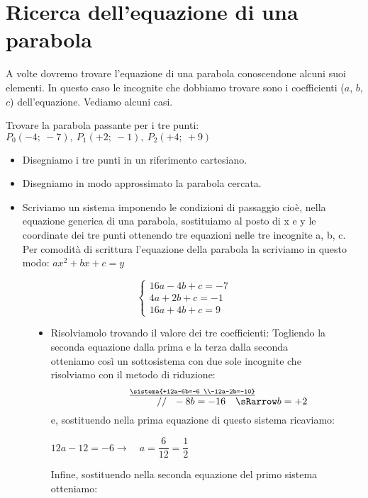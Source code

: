 \section{Ricerca dell'equazione di una parabola}
\label{sec:parabola_altreparabole}

A volte dovremo trovare l'equazione di una parabola conoscendone alcuni suoi
elementi. In questo caso le incognite che dobbiamo trovare sono i coefficienti
(\(a\), \(b\), \(c\)) dell'equazione. Vediamo alcuni casi.

\begin{esempio}
 Trovare la parabola passante per i tre
 punti:~\(P_0(-4;~-7),~ P_1(+2;~-1),~ P_2(+4;~+9)\)

 \begin{itemize}
  \item Disegniamo i tre punti in un riferimento cartesiano.
  \item Disegniamo in modo approssimato la parabola cercata.
  \item Scriviamo un sistema imponendo le condizioni di passaggio cioè,
   nella equazione generica di una parabola, sostituiamo al posto di x e y
   le coordinate dei tre punti ottenendo tre equazioni nelle tre
   incognite a, b, c. Per comodità di scrittura l'equazione della parabola la
   scriviamo in questo modo: \(ax^2+bx+c=y\)
 \end{itemize}
\begin{figure}[h]
\begin{minipage}{.60\textwidth}
\[\left\{\begin{array}{l}
  16a-4b+c=-7\\
  4a+2b+c=-1\\
  16a+4b+c=9
\end{array}\right. \]
 \begin{itemize}
  \item Risolviamolo trovando il valore dei tre coefficienti:
   Togliendo la seconda equazione dalla prima e la terza dalla seconda
   otteniamo così un sottosistema con due sole incognite che risolviamo con
   il metodo di riduzione:
\[\stackrel{\underline{\sistema{+12a-6b=-6 \\-12a-2b=-10}}}
  {\qquad \qquad \qquad ~~~~~~ // ~~ -8b =-16 \quad \sRarrow b=+2}\]
e, sostituendo nella prima equazione di questo sistema ricaviamo:

\(12a-12=-6 \rightarrow \quad a=\dfrac{6}{12}=\dfrac{1}{2}\)

Infine, sostituendo nella seconda equazione del primo sistema otteniamo:


\end{itemize}
\end{minipage}
\end{figure}
\end{esempio}
